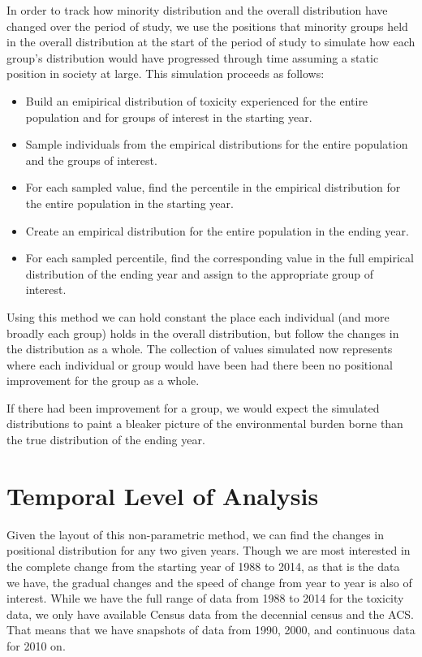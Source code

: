 \documentclass[12pt,twoside]{dukestatscithesis}
\theoremstyle{definition}
\theoremstyle{definition}
\theoremstyle{definition}
\theoremstyle{remark}
\begin{document}
In order to track how minority distribution and the overall distribution
have changed over the period of study, we use the positions that
minority groups held in the overall distribution at the start of the
period of study to simulate how each group's distribution would have
progressed through time assuming a static position in society at large.
This simulation proceeds as follows:
\begin{itemize}
\item
  Build an emipirical distribution of toxicity experienced for the
  entire population and for groups of interest in the starting year.
\item
  Sample individuals from the empirical distributions for the entire
  population and the groups of interest.
\item
  For each sampled value, find the percentile in the empirical
  distribution for the entire population in the starting year.
\item
  Create an empirical distribution for the entire population in the
  ending year.
\item
  For each sampled percentile, find the corresponding value in the full
  empirical distribution of the ending year and assign to the
  appropriate group of interest.
\end{itemize}
Using this method we can hold constant the place each individual (and
more broadly each group) holds in the overall distribution, but follow
the changes in the distribution as a whole. The collection of values
simulated now represents where each individual or group would have been
had there been no positional improvement for the group as a whole.

If there had been improvement for a group, we would expect the simulated
distributions to paint a bleaker picture of the environmental burden
borne than the true distribution of the ending year.

\section{Temporal Level of Analysis}\label{temporal-level-of-analysis}

Given the layout of this non-parametric method, we can find the changes
in positional distribution for any two given years. Though we are most
interested in the complete change from the starting year of 1988 to
2014, as that is the data we have, the gradual changes and the speed of
change from year to year is also of interest. While we have the full
range of data from 1988 to 2014 for the toxicity data, we only have
available Census data from the decennial census and the ACS. That means
that we have snapshots of data from 1990, 2000, and continuous data for
2010 on.
\end{document}
